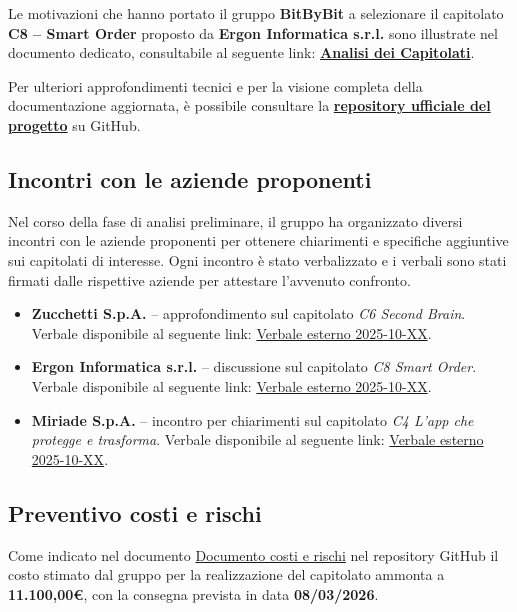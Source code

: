\documentclass[a4paper,12pt]{article}
\begin{document}
Le motivazioni che hanno portato il gruppo \textbf{BitByBit} a selezionare il capitolato \textbf{C8 – Smart Order} proposto da \textbf{Ergon Informatica s.r.l.} sono illustrate nel documento dedicato, consultabile al seguente link:  
\href{<LINK_ANALISI_CAPITOLATI>}{\textbf{Analisi dei Capitolati}}.

Per ulteriori approfondimenti tecnici e per la visione completa della documentazione aggiornata, è possibile consultare la \href{<LINK_REPOSITORY>}{\textbf{repository ufficiale del progetto}} su GitHub.

\subsection{Incontri con le aziende proponenti}

Nel corso della fase di analisi preliminare, il gruppo ha organizzato diversi incontri con le aziende proponenti per ottenere chiarimenti e specifiche aggiuntive sui capitolati di interesse.  
Ogni incontro è stato verbalizzato e i verbali sono stati firmati dalle rispettive aziende per attestare l’avvenuto confronto.

\begin{itemize}
    \item \textbf{Zucchetti S.p.A.} – approfondimento sul capitolato \emph{C6 Second Brain}.  
    Verbale disponibile al seguente link: \href{<LINK_VERBALE_ZUCCHETTI>}{Verbale esterno 2025-10-XX}.
    \item \textbf{Ergon Informatica s.r.l.} – discussione sul capitolato \emph{C8 Smart Order}.  
    Verbale disponibile al seguente link: \href{<LINK_VERBALE_ERGON>}{Verbale esterno 2025-10-XX}.
    \item \textbf{Miriade S.p.A.} – incontro per chiarimenti sul capitolato \emph{C4 L’app che protegge e trasforma}.  
    Verbale disponibile al seguente link: \href{<LINK_VERBALE_MIRIADE>}{Verbale esterno 2025-10-XX}.
\end{itemize}

\subsection{Preventivo costi e rischi}
Come indicato nel documento \href{URL}{Documento costi e rischi} nel repository GitHub il costo stimato dal gruppo per la realizzazione del capitolato ammonta a \textbf{11.100,00€}, con la consegna prevista in data \textbf{08/03/2026}.
\end{document}
